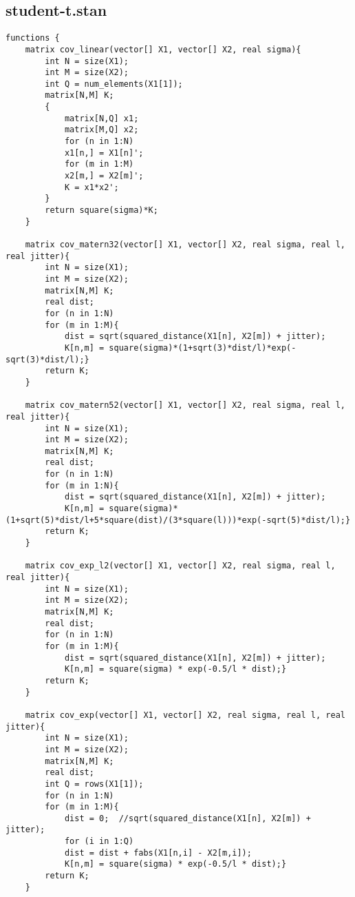 \subsection{student-t.stan}
\lstset{basicstyle=\tiny, style=Stan}
\begin{lstlisting}
functions {
	matrix cov_linear(vector[] X1, vector[] X2, real sigma){
		int N = size(X1);
		int M = size(X2);
		int Q = num_elements(X1[1]);
		matrix[N,M] K;
		{
			matrix[N,Q] x1;
			matrix[M,Q] x2;
			for (n in 1:N)
			x1[n,] = X1[n]';
			for (m in 1:M)
			x2[m,] = X2[m]';
			K = x1*x2';
		}
		return square(sigma)*K;
	}
	
	matrix cov_matern32(vector[] X1, vector[] X2, real sigma, real l, real jitter){
		int N = size(X1);
		int M = size(X2);
		matrix[N,M] K;
		real dist;
		for (n in 1:N)
		for (m in 1:M){
			dist = sqrt(squared_distance(X1[n], X2[m]) + jitter);
			K[n,m] = square(sigma)*(1+sqrt(3)*dist/l)*exp(-sqrt(3)*dist/l);}
		return K;
	}
	
	matrix cov_matern52(vector[] X1, vector[] X2, real sigma, real l, real jitter){
		int N = size(X1);
		int M = size(X2);
		matrix[N,M] K;
		real dist;
		for (n in 1:N)
		for (m in 1:N){
			dist = sqrt(squared_distance(X1[n], X2[m]) + jitter);
			K[n,m] = square(sigma)*(1+sqrt(5)*dist/l+5*square(dist)/(3*square(l)))*exp(-sqrt(5)*dist/l);}
		return K;
	}
	
	matrix cov_exp_l2(vector[] X1, vector[] X2, real sigma, real l, real jitter){
		int N = size(X1);
		int M = size(X2);
		matrix[N,M] K;
		real dist;
		for (n in 1:N)
		for (m in 1:M){
			dist = sqrt(squared_distance(X1[n], X2[m]) + jitter);
			K[n,m] = square(sigma) * exp(-0.5/l * dist);}
		return K;
	}
	
	matrix cov_exp(vector[] X1, vector[] X2, real sigma, real l, real jitter){
		int N = size(X1);
		int M = size(X2);
		matrix[N,M] K;
		real dist;
		int Q = rows(X1[1]);
		for (n in 1:N)
		for (m in 1:M){
			dist = 0;  //sqrt(squared_distance(X1[n], X2[m]) + jitter);
			for (i in 1:Q)
			dist = dist + fabs(X1[n,i] - X2[m,i]);
			K[n,m] = square(sigma) * exp(-0.5/l * dist);}
		return K;
	}
	

\end{lstlisting}

